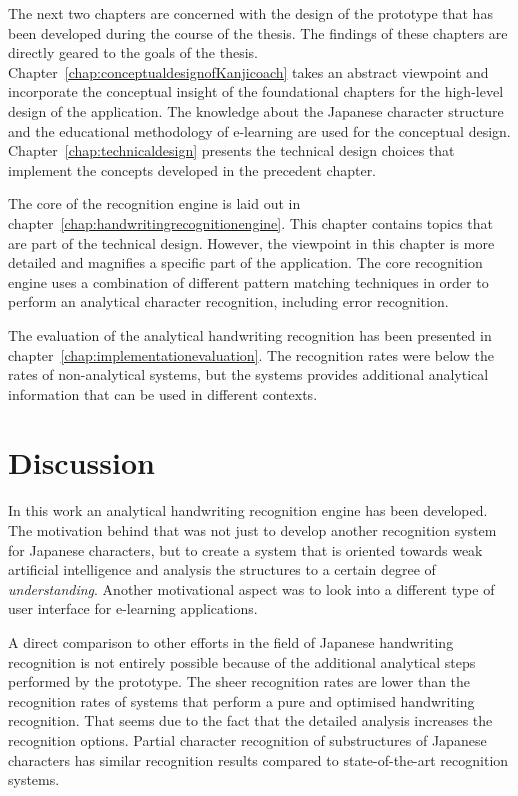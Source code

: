 The next two chapters are concerned with the design of the prototype
that has been developed during the course of the thesis. The findings 
of these chapters are directly geared to the goals of the thesis.
Chapter~\ref{chap:conceptualdesignofKanjicoach} takes an abstract viewpoint 
and incorporate the conceptual insight of the foundational chapters for the 
high-level design of the application. The knowledge about the 
Japanese character structure and the educational methodology of e-learning
are used for the conceptual design.
Chapter~\ref{chap:technicaldesign} presents the 
technical design choices that implement the concepts developed in the
precedent chapter. 

The core of the recognition engine is laid out in 
chapter~\ref{chap:handwritingrecognitionengine}. This chapter contains topics
that are part of the technical design. However, the viewpoint in this chapter
is more detailed and magnifies a specific part of the application. The core
recognition engine uses a combination of different pattern matching techniques
in order to perform an analytical character recognition, including error
recognition.

The evaluation of the analytical handwriting recognition has been
presented in chapter~\ref{chap:implementationevaluation}. The recognition rates
were below the rates of non-analytical systems, but the systems provides 
additional analytical information that can be used in different contexts.

\section{Discussion}
\label{sec:conclusion:discussion}

In this work an analytical handwriting recognition engine has been developed.
The motivation behind that was not just to develop another recognition system
for Japanese characters, but to create a system that is oriented towards
weak artificial intelligence and analysis the structures to a certain degree
of \emph{understanding}. Another motivational aspect was to look into a
different type of user interface for e-learning applications.

A direct comparison to other efforts in the field of Japanese handwriting 
recognition is not entirely possible because of the additional analytical steps
performed by the prototype.
The sheer recognition rates are lower than the recognition rates of systems
that perform a pure and optimised handwriting recognition.
That seems due to the fact that the detailed analysis increases the 
recognition options.
Partial character recognition of substructures of Japanese characters
has similar recognition results compared to state-of-the-art recognition 
systems.


